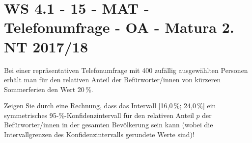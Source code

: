 \section{WS 4.1 - 15 - MAT - Telefonumfrage - OA - Matura 2. NT 2017/18}

\begin{beispiel}[WS 4.1]{1}
Bei einer repräsentativen Telefonumfrage mit 400 zufällig ausgewählten Personen erhält man für den relativen Anteil der Befürworter/innen von kürzeren Sommerferien den Wert 20\,\%.


Zeigen Sie durch eine Rechnung, dass das Intervall [16,0\,\%; 24,0\,\%] ein symmetrisches
95-\%-Konfidenzintervall für den relativen Anteil $p$ der Befürworter/innen in der gesamten Bevölkerung sein kann (wobei die Intervallgrenzen des Konfidenzintervalls gerundete Werte sind)!

\end{beispiel}